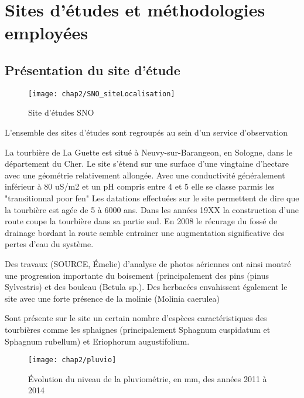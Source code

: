 
\chapter{Sites d'études et méthodologies employées}
\newpage

\section{Présentation du site d'étude}

\begin{figure}
\centering
\texttt{[image: chap2/SNO\_siteLocalisation]}
\caption{Site d'études SNO}
\label{fig:tair}
\end{figure}


L'ensemble des sites d'études sont regroupés au sein d'un service d'observation


La tourbière de La Guette est situé à Neuvy-sur-Barangeon, en Sologne, dans le département du Cher.
Le site s'étend sur une surface d'une vingtaine d'hectare avec une géométrie relativement allongée.
Avec une conductivité généralement inférieur à 80 uS/m2 et un pH compris entre 4 et 5 elle se classe parmis les "transitionnal poor fen"
Les datations effectuées sur le site permettent de dire que la tourbière est agée de 5 à 6000 ans.
Dans les années 19XX la construction d'une route coupe la tourbière dans sa partie sud.
En 2008 le récurage du fossé de drainage bordant la route semble entrainer une augmentation significative des pertes d'eau du système.

Des travaux (SOURCE, Émelie) d'analyse de photos aériennes ont ainsi montré une progression importante du boisement (principalement des pins (pinus Sylvestris) et des bouleau (Betula sp.). Des herbacées envahissent également le site avec une forte présence de la molinie (Molinia caerulea)

Sont présente sur le site un certain nombre d'espèces caractéristiques des tourbières comme les sphaignes (principalement Sphagnum cuspidatum et Sphagnum rubellum) et Eriophorum augustifolium.

\begin{figure}
\centering
\texttt{[image: chap2/pluvio]}
\caption{Évolution du niveau de la pluviométrie, en \si{\mm}, des années 2011 à 2014}
\label{fig:pluvio}
\end{figure}

